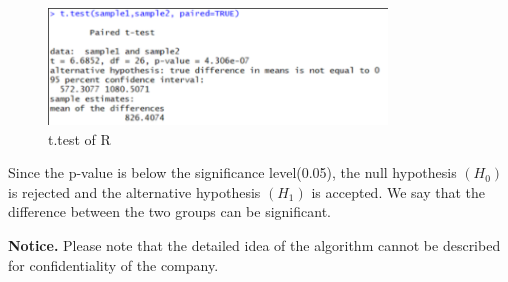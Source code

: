 \begin{figure}[h!]
	\centering
	\includegraphics[width=9cm]{ttest.pdf}
	\caption{t.test of R}
	\label{fig:ttest}       %
\end{figure}

Since the p-value is below the significance level(0.05), the null hypothesis $(H_{0})$ is rejected and the alternative hypothesis $(H_{1})$ is accepted. We say that the difference between the two groups can be significant.

{\bf Notice.} Please note that the detailed idea of the algorithm cannot be described for confidentiality of the company.

%


